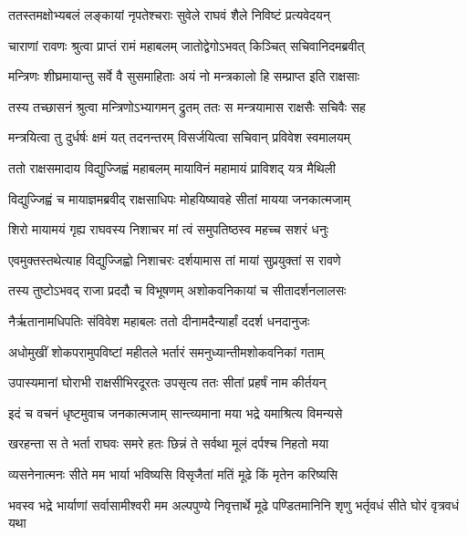 
\twolineshloka
{ततस्तमक्षोभ्यबलं लङ्कायां नृपतेश्चराः}
{सुवेले राघवं शैले निविष्टं प्रत्यवेदयन्} %

\twolineshloka
{चाराणां रावणः श्रुत्वा प्राप्तं रामं महाबलम्}
{जातोद्वेगोऽभवत् किञ्चित् सचिवानिदमब्रवीत्} %

\twolineshloka
{मन्त्रिणः शीघ्रमायान्तु सर्वे वै सुसमाहिताः}
{अयं नो मन्त्रकालो हि सम्प्राप्त इति राक्षसाः} %

\twolineshloka
{तस्य तच्छासनं श्रुत्वा मन्त्रिणोऽभ्यागमन् द्रुतम्}
{ततः स मन्त्रयामास राक्षसैः सचिवैः सह} %

\twolineshloka
{मन्त्रयित्वा तु दुर्धर्षः क्षमं यत् तदनन्तरम्}
{विसर्जयित्वा सचिवान् प्रविवेश स्वमालयम्} %

\twolineshloka
{ततो राक्षसमादाय विद्युज्जिह्वं महाबलम्}
{मायाविनं महामायं प्राविशद् यत्र मैथिली} %

\twolineshloka
{विद्युज्जिह्वं च मायाज्ञमब्रवीद् राक्षसाधिपः}
{मोहयिष्यावहे सीतां मायया जनकात्मजाम्} %

\twolineshloka
{शिरो मायामयं गृह्य राघवस्य निशाचर}
{मां त्वं समुपतिष्ठस्व महच्च सशरं धनुः} %

\twolineshloka
{एवमुक्तस्तथेत्याह विद्युज्जिह्वो निशाचरः}
{दर्शयामास तां मायां सुप्रयुक्तां स रावणे} %

\twolineshloka
{तस्य तुष्टोऽभवद् राजा प्रददौ च विभूषणम्}
{अशोकवनिकायां च सीतादर्शनलालसः} %

\twolineshloka
{नैर्ऋतानामधिपतिः संविवेश महाबलः}
{ततो दीनामदैन्यार्हां ददर्श धनदानुजः} %

\twolineshloka
{अधोमुखीं शोकपरामुपविष्टां महीतले}
{भर्तारं समनुध्यान्तीमशोकवनिकां गताम्} %

\twolineshloka
{उपास्यमानां घोराभी राक्षसीभिरदूरतः}
{उपसृत्य ततः सीतां प्रहर्षं नाम कीर्तयन्} %

\twolineshloka
{इदं च वचनं धृष्टमुवाच जनकात्मजाम्}
{सान्त्व्यमाना मया भद्रे यमाश्रित्य विमन्यसे} %

\twolineshloka
{खरहन्ता स ते भर्ता राघवः समरे हतः}
{छिन्नं ते सर्वथा मूलं दर्पश्च निहतो मया} %

\twolineshloka
{व्यसनेनात्मनः सीते मम भार्या भविष्यसि}
{विसृजैतां मतिं मूढे किं मृतेन करिष्यसि} %

\threelineshloka
{भवस्व भद्रे भार्याणां सर्वासामीश्वरी मम}
{अल्पपुण्ये निवृत्तार्थे मूढे पण्डितमानिनि}
{शृणु भर्तृवधं सीते घोरं वृत्रवधं यथा} %

